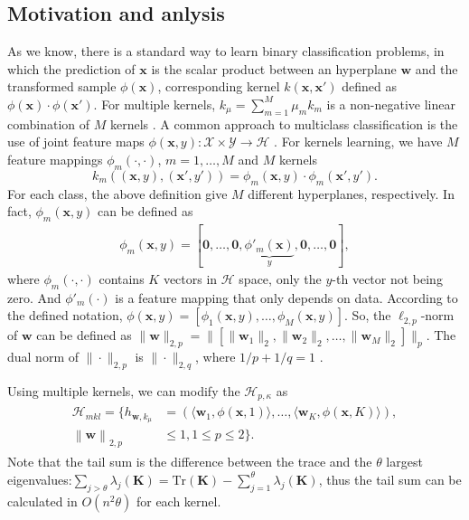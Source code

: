 \documentclass{article}
\begin{document}
\subsection{Motivation and anlysis}
As we know, there is a standard way to learn binary classification problems,
in which the prediction of $\mathbf x$ is the scalar product between an hyperplane $\mathbf w$ and the transformed sample $\phi(\mathbf x)$,
corresponding kernel $k(\mathbf x, \mathbf x')$ defined as $\phi(\mathbf x) \cdot \phi(\mathbf x')$.
For multiple kernels, $k_\mu=\sum_{m=1}^M \mu_mk_m$ is a non-negative linear combination of $M$ kernels \cite{BachLJ04}.
A common approach to multiclass classification is the use of joint feature
maps $\phi(\mathbf x, y):\mathcal X \times \mathcal Y \to \mathcal H$ \cite{TsochantaridisHJA04}.
For kernels learning, we have $M$ feature mappings $\phi_m(\cdot,\cdot)$,
$m=1,\ldots,M$ and $M$ kernels
$$k_m((\mathbf x, y),(\mathbf x', y'))=\phi_m(\mathbf x, y) \cdot \phi_m(\mathbf x', y').$$
For each class, the above definition give $M$ different hyperplanes, respectively. In fact, $\phi_m(\mathbf x, y)$ can be defined as
\begin{align*}
   \phi_m(\mathbf x, y)=[\mathbf 0,\ldots, \mathbf 0,\underbrace{\phi'_m(\mathbf x)}_{y},\mathbf 0,\ldots,\mathbf 0],
\end{align*}
where $\phi_m(\cdot, \cdot)$ contains $K$ vectors in $\mathcal{H}$ space, only the $y$-th vector not being zero.
And $\phi'_m(\cdot)$ is a feature mapping that only depends on data.
According to the defined notation, $\phi(\mathbf x, y)=[\phi_1(\mathbf x, y),\ldots, \phi_M(\mathbf x, y)]$.
So, the $\ell_{2,p}$-norm of $\mathbf{w}$ can be defined as $\|\mathbf w\|_{2,p}=\|[\|\mathbf{w}_1\|_2,\|\mathbf{w}_2\|_2,\ldots,\|\mathbf{w}_M\|_2]\|_p$. The dual norm of $\|\cdot\|_{2,p}$ is $\|\cdot\|_{2,q}$, where $1/p+1/q=1$ \cite{kakade2009duality}.

Using multiple kernels, we can modify the $\mathcal{H}_{p,\kappa}$ as
 \begin{align*}
 \label{hypothspapcemkl}
   \begin{aligned}
   \mathcal{H}_{mkl}=\Big\{h_{\mathbf{w},k_\mu}&=\left(\langle \mathbf w_1,\phi(\mathbf x,1)\rangle,\ldots, \langle\mathbf w_K,\phi(\mathbf x, K)\rangle\right),\\
   \left\|\mathbf  w \right\|_{2,p}&\leq 1, 1\leq p\leq 2
  \Big\}.
   \end{aligned}
 \end{align*}
 Note that the tail sum is the difference between the trace and
 the $\theta$ largest eigenvalues:$\sum_{j>\theta}\lambda_j(\mathbf{K})=\mathrm{Tr}(\mathbf{K})-\sum_{j=1}^\theta\lambda_j(\mathbf{K})$,
 thus the tail sum can be calculated in $O(n^2\theta)$ for each kernel.
\end{document}
